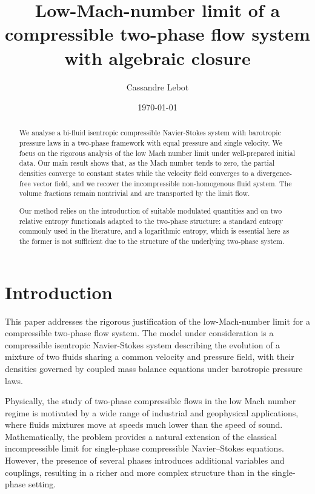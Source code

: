 \documentclass[11pt, twoside, a4paper]{article}
\title{Low-Mach-number limit of a compressible two-phase flow system with algebraic closure}
\author{Cassandre Lebot}
\date{\today}
\theoremstyle{plain}
\theoremstyle{remark}
\numberwithin{equation}{section}
\begin{document}
\maketitle

\begin{abstract}
We analyse a bi-fluid isentropic compressible Navier-Stokes system with barotropic pressure laws in a two-phase framework with equal pressure and single velocity. We focus on the rigorous analysis of the low Mach number limit under well-prepared initial data.
Our main result shows that, as the Mach number tends to zero, the partial densities converge to constant states while the velocity field converges to a divergence-free vector field, and we recover the incompressible non-homogenous fluid system. The volume fractions remain nontrivial and are transported by the limit flow.

Our method relies on the introduction of suitable modulated quantities and on two relative entropy functionals adapted to the two-phase structure: a standard entropy commonly used in the literature, and a logarithmic entropy, which is essential here as the former is not sufficient due to the structure of the underlying two-phase system.



\end{abstract}

\tableofcontents

\section{Introduction}


This paper addresses the rigorous justification of the low-Mach-number limit for a compressible two-phase flow system. The model under consideration is a compressible isentropic Navier-Stokes system describing the evolution of a mixture of two fluids sharing a common velocity and pressure field, with their densities governed by coupled mass balance equations under barotropic pressure laws.

Physically, the study of two-phase compressible flows in the low Mach number regime is motivated by a wide range of industrial and geophysical applications, where fluids mixtures move at speeds much lower than the speed of sound. Mathematically, the problem provides a natural extension of the classical incompressible limit for single-phase compressible Navier–Stokes equations. However, the presence of several phases introduces additional variables and couplings, resulting in a richer and more complex structure than in the single-phase setting.
\end{document}
